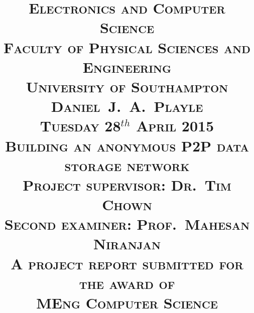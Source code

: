\title{ 
	\vspace{-1.0cm}
	\large{
		\textsc{Electronics and Computer Science}\\
		\textsc{Faculty of Physical Sciences and Engineering}\\
		\textsc{University of Southampton}\\
	}
	\large{
		\vspace{2.5cm}
		\textsc{Daniel~J.~A.~Playle}\\
		\vspace{1.0cm}
		\textsc{Tuesday 28$^{th}$ April 2015}\\
	}
		\vspace{2.5cm}
	\LARGE{
		\textsc{
			Building an anonymous P2P data storage network\\
		}
	}
	\large{
		\vspace{3.5cm}
		\textsc{Project supervisor: Dr.~Tim Chown}\\
		\textsc{Second examiner: Prof.~Mahesan Niranjan}\\
		\vspace{1.5cm}
		\textsc{A project report submitted for the award of}\\
		\textsc{MEng Computer Science\vspace{-3.0cm}}}
	}
\author{}
\date{}
\maketitle